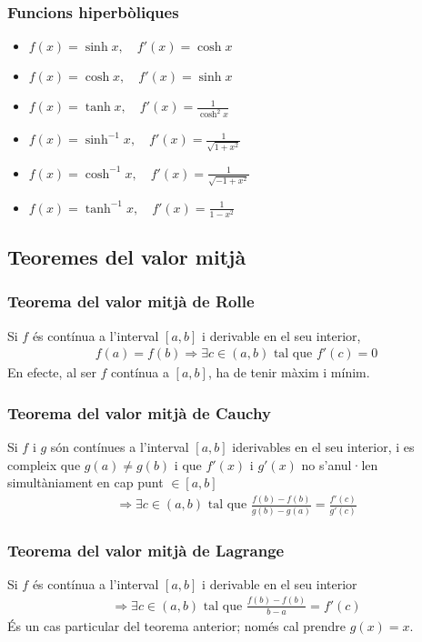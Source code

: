 \subsubsection*{Funcions hiperbòliques}
\begin{itemize}
    \item $f(x) = \sinh x , \quad f'(x) = \cosh x$
    \item $f(x) = \cosh x , \quad f'(x) = \sinh x $
    \item $f(x) = \tanh x , \quad f'(x) = \frac{1}{\cosh^{2} x} $
    \item $f(x) = \sinh^{-1} x, \quad f'(x) = \frac{1}{\sqrt{1 + x^{2}}}$
    \item $f(x) = \cosh^{-1} x, \quad f'(x) = \frac{1}{\sqrt{-1 + x^{2}}}$
    \item $f(x) = \tanh^{-1} x, \quad f'(x) = \frac{1}{1-x^{2}}$
\end{itemize}

\subsection{Teoremes del valor mitjà}
\subsubsection*{Teorema del valor mitjà de Rolle}
Si $f$ és contínua a l'interval $[a,b]$ i derivable en el seu interior, 
\begin{align}    
    f(a) = f(b) \Rightarrow \exists c \in (a,b) \text{ tal que } f'(c) = 0 
\end{align}
En efecte, al ser $f$ contínua a $[a,b]$, ha de tenir màxim i mínim.

\subsubsection*{Teorema del valor mitjà de Cauchy}
Si $f$ i $g$ són contínues a l'interval $[a,b]$ iderivables en el seu interior, i es compleix que $g(a) \neq g(b)$ i que $f'(x)$ i $g'(x)$ no s'anul·len simultàniament en cap punt $\in [a,b]$
\begin{align}
    \Rightarrow \exists c \in (a,b) \text{ tal que } \frac{f(b)-f(b)}{g(b)-g(a)} = \frac{f'(c)}{g'(c)}
\end{align}

\subsubsection*{Teorema del valor mitjà de Lagrange}
Si $f$ és contínua a l'interval $[a,b]$ i derivable en el seu interior
\begin{align}
    \Rightarrow \exists c \in (a,b) \text{ tal que } \frac{f(b)-f(b)}{b-a} = f'(c)
\end{align}
És un cas particular del teorema anterior; només cal prendre $g(x)=x$.

